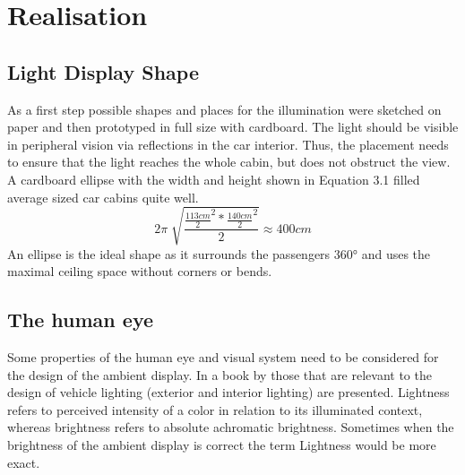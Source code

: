 \chapter{Realisation}
\label{Realisation}
\section{Light Display Shape}
\label{LEDshape}
As a first step possible shapes and places for the illumination were sketched on paper and then prototyped in full size with cardboard. The light should be visible in peripheral vision via reflections in the car interior. Thus, the placement needs to ensure that the light reaches the whole cabin, but does not obstruct the view. A cardboard ellipse with the width and height shown in Equation 3.1 filled average sized car cabins quite well. 
\begin{equation}2\pi \sqrt[]{\frac{\frac{113 cm}{2}^2 * \frac{140 cm}{2}^2}{2}}\approx 400cm \end{equation}
An ellipse is the ideal shape as it surrounds the passengers 360° and uses the maximal ceiling space without corners or bends.

\section{The human eye}
\label{sec:eye}
Some properties of the human eye and visual system need to be considered for the design of the ambient display. In  a book by \citet{Wordenweber2007AutomotiveVision} those that are relevant to the design of vehicle lighting (exterior and interior lighting) are presented. 
Lightness refers to perceived intensity of a color in relation to its illuminated context, whereas brightness refers to absolute achromatic brightness. Sometimes when the brightness of the ambient display is correct the term Lightness would be more exact. 

